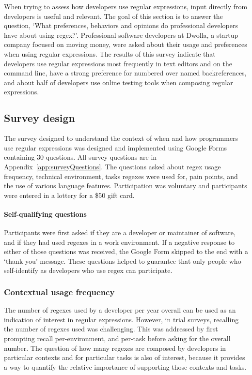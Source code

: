 When trying to assess how developers use regular expressions, input directly from developers is useful and relevant.  The goal of this section is to answer the question, `What preferences, behaviors and opinions do professional developers have about using regex?'.  Professional software developers at Dwolla, a startup company focused on moving money, were asked about their usage and preferences when using regular expressions.  The results of this survey indicate that developers use regular expressions most frequently in text editors and on the command line, have a strong preference for numbered over named backreferences, and about half of developers use online testing tools when composing regular expressions.


\subsection{Survey design}

The survey designed to understand the context of when and how programmers use regular expressions was designed and implemented using Google Forms containing 30 questions.  All survey questions are in Appendix~\ref{app:surveyQuestions}. The questions asked about regex usage frequency, technical environment, tasks regexes were used for, pain points, and the use of various language
features. Participation was voluntary and participants were entered in a lottery for a \$50 gift card.


\paragraph{Self-qualifying questions} Participants were first asked if they are a developer or maintainer of software, and if they had used regexes in a work environment.  If a negative response to either of those questions was received, the Google Form skipped to the end with a `thank you' message.  These questions helped to guarantee that only people who self-identify as developers who use regex can participate.

\subsubsection{Contextual usage frequency}
The number of regexes used by a developer per year overall can be used as an indication of interest in regular expressions.  However, in trial surveys, recalling the number of regexes used was challenging.  This was addressed by first prompting recall per-environment, and per-task before asking for the overall number.  The question of how many regexes are composed by developers in particular contexts and for particular tasks is also of interest, because it provides a way to quantify the relative importance of supporting those contexts and tasks.

